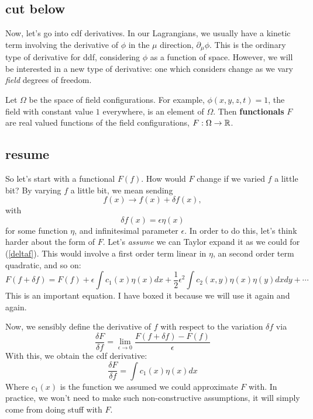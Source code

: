 \documentclass[main.tex]{subfiles}
\begin{document}
\subsection{cut below}
Now, let's go into cdf derivatives. In our Lagrangians, we usually have a kinetic term involving the derivative of $\phi$ in the $\mu$ direction, $\partial_\mu \phi$. This is the ordinary type of derivative for ddf, considering $\phi$ as a function of space. However, we will be interested in a new type of derivative: one which considers change as we vary \textit{field} degrees of freedom.

Let $\Omega$ be the space of field configurations. For example, $\phi(x,y,z,t) = 1$, the field with constant value $1$ everywhere, is an element of $\Omega$. Then \textbf{functionals} $F$ are real valued functions of the field configurations, $F:\Omega \to \mathbb{R}$. 
\subsection{resume}
So let's start with a functional $F(f)$. How would $F$ change if we varied $f$ a little bit? By varying $f$ a little bit, we mean sending
\[
f(x) \to f(x) + \delta f(x),
\]
with
\[
\delta f(x) = \epsilon \eta (x)
\]
for some function $\eta$, and infinitesimal parameter $\epsilon$. In order to do this, let's think harder about the form of $F$. Let's \textit{assume} we can Taylor expand it as we could for (\ref{deltaf}). This would involve a first order term linear in $\eta$, an second order term quadratic, and so on:
\begin{equation} \label{taylorF}
\boxed{F(f + \delta f) = F(f) + \epsilon \int c_1(x) \eta(x) dx + \frac{1}{2} \epsilon^2 \int c_2 (x,y) \eta(x) \eta(y) dx dy + \cdots}
\end{equation}
This is an important equation. I have boxed it because we will use it again and again.

Now, we sensibly define the derivative of $f$ with respect to the variation $\delta f$ via
\[
\frac{\delta F}{\delta f} = \lim_{\epsilon \to 0} \frac{F(f + \delta f) - F(f)}{\epsilon}
\]
With this, we obtain the cdf derivative:
\begin{equation} \label{delta F}
\frac{\delta F}{\delta f} = \int c_1 (x) \eta (x) dx
\end{equation}
Where $c_1 (x)$ is the function we assumed we could approximate $F$ with. In practice, we won't need to make such non-constructive assumptions, it will simply come from doing stuff with $F$. 
\end{document}
